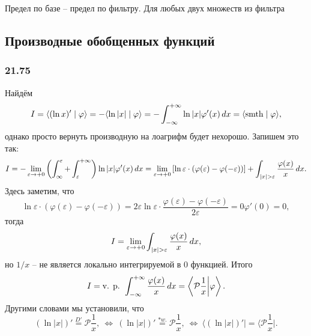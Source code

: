 Предел по базе -- предел по фильтру. Для любых двух множеств из фильтра


\subsection{Производные обобщенных функций}

\subsubsection*{21.75}


Найдём 
\begin{equation*}
    I = \langle (\ln x)' \mid \varphi \rangle = - \langle \ln|x| \mid \varphi \rangle = 
    - \int_{-\infty}^{+\infty} \ln |x| \varphi'(x) \, d x = \langle \text{smth} \mid \varphi \rangle,
\end{equation*}
однако просто вернуть производную на лоагрифм будет нехорошо. Запишем это так:
\begin{equation*}
    I =  - \lim_{\varepsilon \to + 0} \left(
        \int_{\infty}^{\varepsilon} + \int_{\varepsilon}^{+\infty}
    \right) \ln |x| \varphi'(x) \d x = \lim_{\varepsilon \to +0}\left[
        \ln \varepsilon \cdot (\varphi(\varepsilon)-\varphi(-\varepsilon))
    \right] + \int_{|x|>\varepsilon} \frac{\varphi(x)}{x} \d x.
\end{equation*}
Здесь заметим, что
\begin{equation*}
    \ln \varepsilon \cdot (\varphi(\varepsilon) - \varphi(-\varepsilon)) = 2 \varepsilon \ln \varepsilon \cdot \frac{\varphi(\varepsilon)-\varphi(-\varepsilon)}{2 \varepsilon} = 0 \varphi'(0) = 0,
\end{equation*}
тогда 
\begin{equation*}
    I = \lim_{\varepsilon \to +0} \int_{|x|>\varepsilon} \frac{\varphi(x)}{x}\d x,
\end{equation*}
но $1/x$ -- не является локально интегрируемой в $0$ функцией. Итого
\begin{equation*}
    I = \text{v. p. } \int_{-\infty}^{+\infty} \frac{\varphi(x)}{x} \, d x = 
    \left\langle  
                \mathcal P \frac{1}{x} \bigg| \varphi
            \right\rangle.
\end{equation*}
Другими словами мы установили, что
\begin{equation*}
    (\ln |x|)' \overset{D'}{=} \mathcal P \frac{1}{x}, \ 
    \Leftrightarrow \ 
    (\ln |x|)' \overset{* w.}{=} \mathcal P \frac{1}{x},
    \ 
    \Leftrightarrow \ 
    \big\langle (\ln |x|)' \big| = \bigg\langle \mathcal P \frac{1}{x} \bigg|.
\end{equation*}

